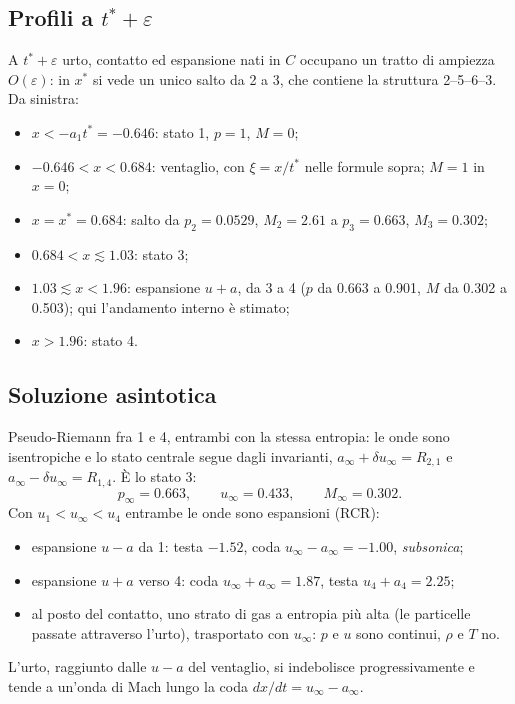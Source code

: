 \documentclass[11pt,a4paper]{article}
\newcommand{\uma}{u-a}
\newcommand{\upa}{u+a}
\begin{document}
\subsection*{Profili a $t^*+\varepsilon$}
A $t^*+\varepsilon$ urto, contatto ed espansione nati in $C$ occupano un tratto di ampiezza $O(\varepsilon)$:
in $x^*$ si vede un unico salto da 2 a 3, che contiene la struttura 2--5--6--3. Da sinistra:
\begin{itemize}
\item $x<-a_1t^*=-\num{0.646}$: stato 1, $p=1$, $M=0$;
\item $-\num{0.646}<x<\num{0.684}$: ventaglio, con $\xi=x/t^*$ nelle formule sopra; $M=1$ in $x=0$;
\item $x=x^*=\num{0.684}$: salto da $p_2=\num{0.0529}$, $M_2=\num{2.61}$ a $p_3=\num{0.663}$, $M_3=\num{0.302}$;
\item $\num{0.684}<x\lesssim\num{1.03}$: stato 3;
\item $\num{1.03}\lesssim x<\num{1.96}$: espansione $\upa$, da 3 a 4 ($p$ da \num{0.663} a \num{0.901}, $M$ da
  \num{0.302} a \num{0.503}); qui l'andamento interno è stimato;
\item $x>\num{1.96}$: stato 4.
\end{itemize}

\subsection*{Soluzione asintotica}
Pseudo-Riemann fra 1 e 4, entrambi con la stessa entropia: le onde sono isentropiche e lo stato centrale
segue dagli invarianti, $a_\infty+\delta u_\infty=R_{2,1}$ e $a_\infty-\delta u_\infty=R_{1,4}$. È lo stato 3:
\[
p_\infty=\num{0.663},\qquad u_\infty=\num{0.433},\qquad M_\infty=\num{0.302}.
\]
Con $u_1<u_\infty<u_4$ entrambe le onde sono espansioni (RCR):
\begin{itemize}
\item espansione $\uma$ da 1: testa $-\num{1.52}$, coda $u_\infty-a_\infty=-\num{1.00}$, \emph{subsonica};
\item espansione $\upa$ verso 4: coda $u_\infty+a_\infty=\num{1.87}$, testa $u_4+a_4=\num{2.25}$;
\item al posto del contatto, uno strato di gas a entropia più alta (le particelle passate attraverso l'urto),
  trasportato con $u_\infty$: $p$ e $u$ sono continui, $\rho$ e $T$ no.
\end{itemize}
L'urto, raggiunto dalle $\uma$ del ventaglio, si indebolisce progressivamente e tende a un'onda di Mach lungo la
coda $dx/dt=u_\infty-a_\infty$.
\end{document}
